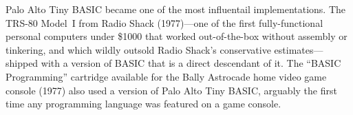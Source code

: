 Palo Alto Tiny BASIC became one of the most influentail implementations.
The TRS-80 Model~I from Radio Shack (1977)---one of the first
fully-functional personal computers under \$1000 that worked
out-of-the-box without assembly or tinkering, and which wildly outsold
Radio Shack's conservative estimates---shipped with a version
of BASIC that is a direct descendant of it.
The ``BASIC Programming'' cartridge available for the Bally Astrocade
home video game console (1977) also used a version of Palo Alto Tiny
BASIC, arguably the first time any programming language was featured on
a game console.


